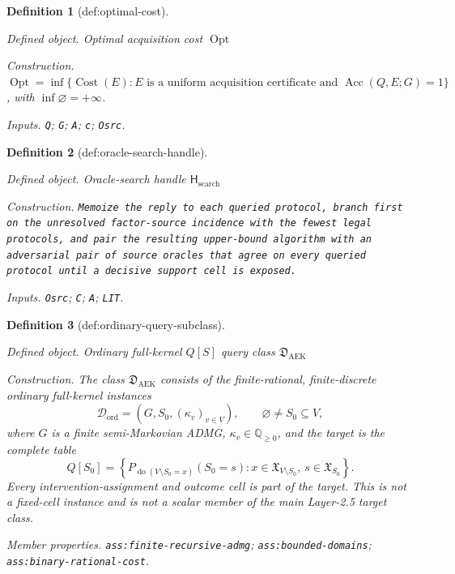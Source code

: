 \documentclass{article}
\newtheorem{definition}{Definition}
\begin{document}
\begin{definition}[def:optimal-cost]\label{def:optimal-cost}
\par\smallskip\noindent\emph{Defined object.} Optimal acquisition cost \(\operatorname{Opt}\)
\par\smallskip\noindent\emph{Construction.} \(\operatorname{Opt}=\inf\{\operatorname{Cost}(E): E\text{ is a uniform acquisition certificate and }\operatorname{Acc}(Q,E;G)=1\}\), with \(\inf\varnothing=+\infty\).
\par\smallskip\noindent\emph{Inputs.} \texttt{Q}; \texttt{G}; \texttt{A}; \texttt{c}; \texttt{Osrc}.
\end{definition}

\begin{definition}[def:oracle-search-handle]\label{def:oracle-search-handle}
\par\smallskip\noindent\emph{Defined object.} Oracle-search handle \(\mathsf H_{\mathrm{search}}\)
\par\smallskip\noindent\emph{Construction.} \texttt{Memoize the reply to each queried protocol,\allowbreak{} branch first on the unresolved factor-\allowbreak{}source incidence with the fewest legal protocols,\allowbreak{} and pair the resulting upper-\allowbreak{}bound algorithm with an adversarial pair of source oracles that agree on every queried protocol until a decisive support cell is exposed.}
\par\smallskip\noindent\emph{Inputs.} \texttt{Osrc}; \texttt{C}; \texttt{A}; \texttt{LIT}.
\end{definition}

\begin{definition}[def:ordinary-query-subclass]\label{def:ordinary-query-subclass}
\par\smallskip\noindent\emph{Defined object.} Ordinary full-kernel \(Q[S]\) query class \(\mathfrak D_{\mathrm{AEK}}\)
\par\smallskip\noindent\emph{Construction.} The class \(\mathfrak D_{\mathrm{AEK}}\) consists of the finite-rational, finite-discrete ordinary full-kernel instances
\[
 \mathcal D_{\mathrm{ord}}=(G,S_0,(\kappa_v)_{v\in V}),
 \qquad \varnothing\ne S_0\subseteq V,
\]
where \(G\) is a finite semi-Markovian ADMG, \(\kappa_v\in\mathbb Q_{\ge0}\), and the target is the complete table
\[
 Q[S_0]
 =\left\{P_{\operatorname{do}(V\setminus S_0=x)}(S_0=s):
 x\in\mathfrak X_{V\setminus S_0},\ s\in\mathfrak X_{S_0}\right\}.
\]
Every intervention-assignment and outcome cell is part of the target.  This is not a fixed-cell instance and is not a scalar member of the main Layer-2.5 target class.
\par\smallskip\noindent\emph{Member properties.} \texttt{ass:\allowbreak{}finite-\allowbreak{}recursive-\allowbreak{}admg}; \texttt{ass:\allowbreak{}bounded-\allowbreak{}domains}; \texttt{ass:\allowbreak{}binary-\allowbreak{}rational-\allowbreak{}cost}.
\end{definition}
\end{document}
